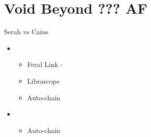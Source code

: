 \chapter{Void Beyond ??? AF}


\begin{battle}{Serah vs Caius}
	\begin{flushleft}
		\begin{itemize}
			\item \sixth
			      \begin{itemize}
				      \item Feral Link -   \upc \upc \downc
				      \item Librascope
				      \item Auto-chain
			      \end{itemize}
			\item \fifth
			      \begin{itemize}
				      \item Auto-chain
			      \end{itemize}
		\end{itemize}
	\end{flushleft}
\end{battle}